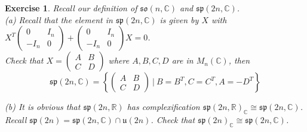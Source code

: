 \documentclass[11pt]{article}
\newtheorem{exercise}[theorem]{Exercise}
\newcommand{\bb}[1]{\mathbb{#1}}
\newcommand{\mf}[1]{\mathfrak{#1}}
\begin{document}
\begin{exercise} \label{simplebasis}
Recall our definition of $\mf{so}(n,\bb{C})$ and $\mf{sp}(2n,\bb{C})$.\\
(a) Recall that the element in $\mf{sp}(2n,\bb{C})$ is given by $X$ with $X^T \left( \begin{array}{cc}
0 & I_n \\
-I_n & 0 \end{array} \right) + \left( \begin{array}{cc}
0 & I_n \\
-I_n & 0 \end{array} \right)X = 0$. \\
Check that $X = \left( \begin{array}{cc}
A & B \\
C & D \end{array} \right)$ where $A, B, C,D$ are in $M_{n}(\bb{C})$, then
$$\mf{sp}(2n,\bb{C}) = \left\{ \left( \begin{array}{cc}
A & B \\
C & D \end{array} \right)\ \Big|\ B = B^T, C = C^T, A = -D^T \right\}$$

\noindent (b) It is obvious that $\mf{sp}(2n,\bb{R})$ has complexification $\mf{sp}(2n,\bb{R})_{\bb{C}} \cong \mf{sp}(2n,\bb{C})$. Recall $\mf{sp}(2n) = \mf{sp}(2n,\bb{C}) \cap \mf{u}(2n)$. Check that $\mf{sp}(2n)_{\bb{C}} \cong \mf{sp}(2n,\bb{C})$.\\


\end{exercise}
\end{document}
